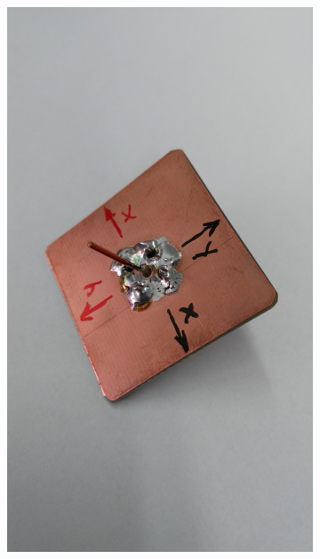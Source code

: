 \begin{figure}[h!]
\begin{subfigure}[b]{0.22\textwidth}
	\end{subfigure}
	\begin{subfigure}[b]{0.22\textwidth}
		\includegraphics[width=1\textwidth]{../fig/pic/monopol_model_2.jpg}
	\end{subfigure}
	\begin{subfigure}[b]{0.22\textwidth}

\end{subfigure}
\end{figure}
